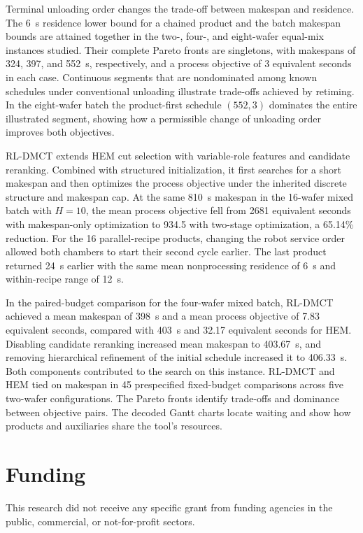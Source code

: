 \documentclass[preprint,12pt,nonatbib]{elsarticle}
\begin{document}
Terminal unloading order changes the trade-off between makespan and residence. The 6~s residence lower bound for a chained product and the batch makespan bounds are attained together in the two-, four-, and eight-wafer equal-mix instances studied. Their complete Pareto fronts are singletons, with makespans of 324, 397, and 552~s, respectively, and a process objective of 3 equivalent seconds in each case. Continuous segments that are nondominated among known schedules under conventional unloading illustrate trade-offs achieved by retiming. In the eight-wafer batch the product-first schedule $(552,3)$ dominates the entire illustrated segment, showing how a permissible change of unloading order improves both objectives.

RL-DMCT extends HEM cut selection with variable-role features and candidate reranking. Combined with structured initialization, it first searches for a short makespan and then optimizes the process objective under the inherited discrete structure and makespan cap. At the same 810~s makespan in the 16-wafer mixed batch with $H=10$, the mean process objective fell from 2681 equivalent seconds with makespan-only optimization to 934.5 with two-stage optimization, a 65.14\% reduction. For the 16 parallel-recipe products, changing the robot service order allowed both chambers to start their second cycle earlier. The last product returned 24~s earlier with the same mean nonprocessing residence of 6~s and within-recipe range of 12~s.

In the paired-budget comparison for the four-wafer mixed batch, RL-DMCT achieved a mean makespan of 398~s and a mean process objective of 7.83 equivalent seconds, compared with 403~s and 32.17 equivalent seconds for HEM. Disabling candidate reranking increased mean makespan to 403.67~s, and removing hierarchical refinement of the initial schedule increased it to 406.33~s. Both components contributed to the search on this instance. RL-DMCT and HEM tied on makespan in 45 prespecified fixed-budget comparisons across five two-wafer configurations. The Pareto fronts identify trade-offs and dominance between objective pairs. The decoded Gantt charts locate waiting and show how products and auxiliaries share the tool's resources.

\section*{Funding}
This research did not receive any specific grant from funding agencies in the public, commercial, or not-for-profit sectors.
\end{document}
